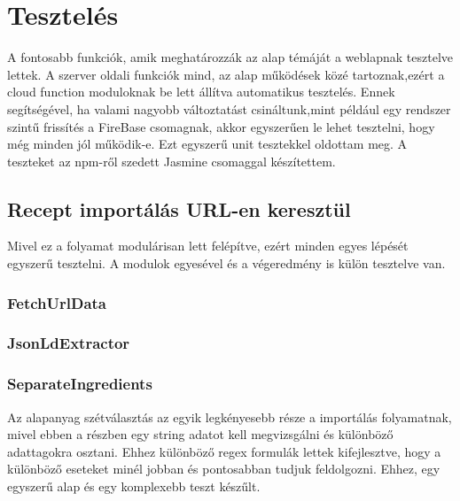 \documentclass[12pt]{report}
\theoremstyle{definition}
\begin{document}




\chapter{Tesztelés}
A fontosabb funkciók, amik meghatározzák az alap témáját a weblapnak tesztelve lettek. A szerver oldali funkciók mind, az alap működések közé tartoznak,ezért a cloud function moduloknak be lett állítva automatikus tesztelés. Ennek segítségével, ha valami nagyobb változtatást csináltunk,mint például egy rendszer szintű frissítés a FireBase csomagnak, akkor egyszerűen le lehet tesztelni, hogy még minden jól működik-e. Ezt egyszerű unit tesztekkel oldottam meg. A teszteket az npm-ről szedett Jasmine csomaggal készítettem.

\section{Recept importálás URL-en keresztül}
Mivel ez a folyamat modulárisan lett felépítve, ezért minden egyes lépését egyszerű tesztelni. A modulok egyesével és a végeredmény is külön tesztelve van.

\subsection{FetchUrlData}

\subsection{JsonLdExtractor}

\subsection{SeparateIngredients}
Az alapanyag szétválasztás az egyik legkényesebb része a importálás folyamatnak, mivel ebben a részben egy string adatot kell megvizsgálni és különböző adattagokra osztani. Ehhez különböző regex formulák lettek kifejlesztve, hogy a különböző eseteket minél jobban és pontosabban tudjuk feldolgozni. Ehhez, egy egyszerű alap és egy komplexebb teszt készűlt.
\end{document}
